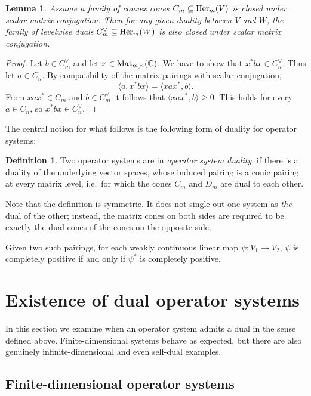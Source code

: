 \documentclass[11pt,onecolumn]{article}
\theoremstyle{plain}
\newtheorem{lemma}[lemma]{Lemma}
\theoremstyle{definition}
\newtheorem{definition}[definition]{Definition}
\begin{document}
\begin{lemma}
\label{lem:dualconj}
    Assume a family of convex cones $C_m\subseteq{\rm Her}_m(V)$ is closed under scalar matrix conjugation. Then for any given duality between $V$ and $W$, the family of levelwise duals $C_m^\vee\subseteq{\rm Her}_m(W)$ is also closed under scalar matrix conjugation. 
\end{lemma}
\begin{proof}
    Let $b\in C_m^\vee$ and let $x\in {\rm Mat}_{m,n}(\mathbb C)$.  We have to
    show that $x^*bx\in C_n^\vee$.  Thus let $a\in C_n$.  By compatibility of
    the matrix pairings with scalar conjugation,
    \[
        \langle a,x^*bx\rangle=\langle xax^*,b\rangle.
    \]
    From $xax^*\in C_m$ and $b\in C_m^\vee$ it follows that
    $\langle xax^*,b\rangle\geqslant 0.$
    This holds for every $a\in C_n$, so $x^*bx\in C_n^\vee$.
\end{proof}


The central notion for what follows is the following form of duality for operator systems:
\begin{definition}
    Two  operator systems are in \emph{operator system duality}, if there is a duality of the underlying vector spaces, whose induced pairing is a conic pairing at every matrix level, i.e.\ for which the cones $C_m$ and $D_m$ are dual to each other. 
\end{definition}

Note that the definition is symmetric.  It does not single out one system as
\emph{the} dual of the other; instead, the matrix cones on both sides are required
to be exactly the dual cones of the cones on the opposite side. 

Given two such pairings, for each weakly continuous linear map
$\psi\colon V_1\to V_2$, $\psi$ is
completely positive if and only if  $\psi^*$ is completely positive.


\section{Existence of dual operator systems}

In this section we examine when an operator system admits a dual in the sense defined above.  Finite-dimensional systems behave as expected, but there are also genuinely infinite-dimensional and even self-dual examples.

\subsection{Finite-dimensional operator systems}
\end{document}
